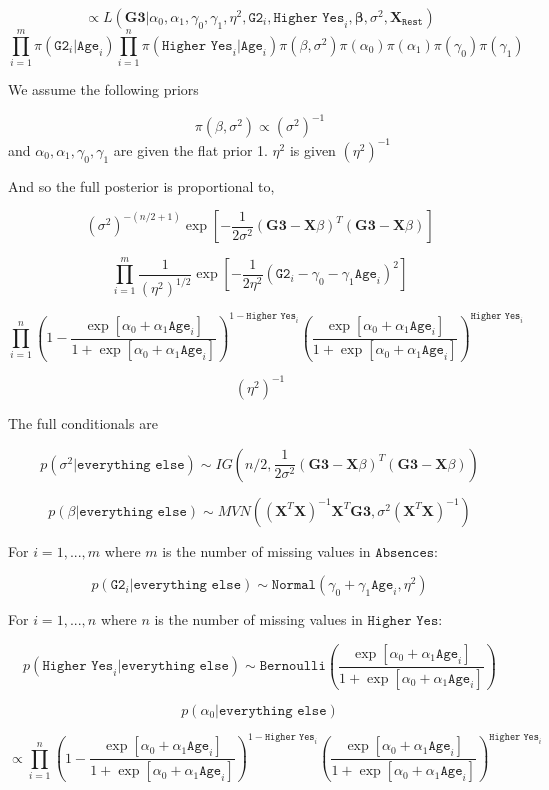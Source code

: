 \documentclass[11pt]{article}
\begin{document}
$$\propto L(\mathbf{G3}|\alpha_0, \alpha_1, \gamma_0, \gamma_1, \eta^2, \texttt{G2}_i, \texttt{Higher Yes}_i, \mathbf{\beta},\sigma^2, \mathbf{X}_{\texttt{Rest}})$$
$$\prod_{i=1}^{m}\pi(\texttt{G2}_i|\texttt{Age}_i)\prod_{i=1}^{n}\pi(\texttt{Higher Yes}_i|\texttt{Age}_i)\pi(\beta, \sigma^2)\pi(\alpha_0)\pi(\alpha_1)\pi(\gamma_0)\pi(\gamma_1)$$


We assume the following priors

$$\pi(\beta, \sigma^2)\propto (\sigma^2)^{-1}$$ and $\alpha_0, \alpha_1, \gamma_0, \gamma_1$ are given the flat prior 1. $\eta^2$ is given $(\eta^2)^{-1}$

And so the full posterior is proportional to,

$$(\sigma^2)^{-(n/2+1)}\exp[-\frac{1}{2\sigma^2}(\mathbf{G3}-\mathbf{X}\beta)^T(\mathbf{G3}-\mathbf{X}\beta)]$$

$$\prod_{i=1}^m \frac{1}{(\eta^2)^{1/2}} \exp \left[-\frac{1}{2\eta^2} (\texttt{G2}_i - \gamma_0 - \gamma_1 \texttt{Age}_i)^2 \right]$$

$$\prod_{i=1}^{n}(1-\frac{\exp[\alpha_0+\alpha_1\texttt{Age}_i]}{1+\exp[\alpha_0+\alpha_1\texttt{Age}_i]})^{1-\texttt{Higher Yes}_i}(\frac{\exp[\alpha_0+\alpha_1\texttt{Age}_i]}{1+\exp[\alpha_0+\alpha_1\texttt{Age}_i]})^{\texttt{Higher Yes}_i}$$

$$(\eta^2)^{-1}$$

The full conditionals are

$$p(\sigma^2|\texttt{everything else}) \sim IG(n/2,\frac{1}{2\sigma^2}(\mathbf{G3}-\mathbf{X}\beta)^T(\mathbf{G3}-\mathbf{X}\beta))$$

$$p(\beta|\texttt{everything else}) \sim MVN((\mathbf{X}^T\mathbf{X})^{-1}\mathbf{X}^T\mathbf{G3}, \sigma^2(\mathbf{X}^T\mathbf{X})^{-1})$$

For $i=1,...,m$ where $m$ is the number of missing values in $\texttt{Absences}$:

$$p(\texttt{G2}_i|\texttt{everything else}) \sim \texttt{Normal}(\gamma_0+\gamma_1\texttt{Age}_i, \eta^2)$$

For $i=1,...,n$ where $n$ is the number of missing values in $\texttt{Higher Yes}$:

$$p(\texttt{Higher Yes}_i|\texttt{everything else}) \sim \texttt{Bernoulli}(\frac{\exp[\alpha_0+\alpha_1\texttt{Age}_i]}{1+\exp[\alpha_0+\alpha_1\texttt{Age}_i]})$$

$$p(\alpha_0|\texttt{everything else})$$

$$\propto \prod_{i=1}^{n}(1-\frac{\exp[\alpha_0+\alpha_1\texttt{Age}_i]}{1+\exp[\alpha_0+\alpha_1\texttt{Age}_i]})^{1-\texttt{Higher Yes}_i}(\frac{\exp[\alpha_0+\alpha_1\texttt{Age}_i]}{1+\exp[\alpha_0+\alpha_1\texttt{Age}_i]})^{\texttt{Higher Yes}_i}$$
\end{document}
